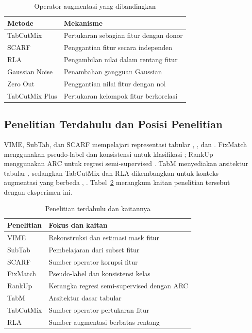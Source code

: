 \begin{table}[!htbp]
\caption{Operator augmentasi yang dibandingkan}
\label{tab:iii}
\centering
\footnotesize
\setlength{\tabcolsep}{3pt}
\renewcommand{\arraystretch}{1.1}
\begin{tabularx}{\columnwidth}{p{}X}
\hline
\textbf{Metode} & \textbf{Mekanisme} \\
\hline
TabCutMix & Pertukaran sebagian fitur dengan donor \cite{ref12} \\
SCARF & Penggantian fitur secara independen \cite{ref7} \\
RLA & Pengambilan nilai dalam rentang fitur \cite{ref13} \\
Gaussian Noise & Penambahan gangguan Gaussian \\
Zero Out & Penggantian nilai fitur dengan nol \\
TabCutMix Plus & Pertukaran kelompok fitur berkorelasi \cite{ref12} \\
\hline
\end{tabularx}
\end{table}

\subsection{Penelitian Terdahulu dan Posisi Penelitian}

VIME, SubTab, dan SCARF mempelajari representasi tabular \cite{ref5}, \cite{ref6}, dan \cite{ref7}. FixMatch menggunakan pseudo-label dan konsistensi untuk klasifikasi \cite{ref9}; RankUp menggunakan ARC untuk regresi semi-supervised \cite{ref10}. TabM menyediakan arsitektur tabular \cite{ref11}, sedangkan TabCutMix dan RLA dikembangkan untuk konteks augmentasi yang berbeda \cite{ref12}, \cite{ref13}. Tabel~\ref{tab:iv} merangkum kaitan penelitian tersebut dengan eksperimen ini.

\begin{table}[!htbp]
\caption{Penelitian terdahulu dan kaitannya}
\label{tab:iv}
\centering
\footnotesize
\setlength{\tabcolsep}{3pt}
\renewcommand{\arraystretch}{1.05}
\begin{tabularx}{\columnwidth}{p{}X}
\hline
\textbf{Penelitian} & \textbf{Fokus dan kaitan} \\
\hline
VIME \cite{ref5} & Rekonstruksi dan estimasi mask fitur \\
SubTab \cite{ref6} & Pembelajaran dari subset fitur \\
SCARF \cite{ref7} & Sumber operator korupsi fitur \\
FixMatch \cite{ref9} & Pseudo-label dan konsistensi kelas \\
RankUp \cite{ref10} & Kerangka regresi semi-supervised dengan ARC \\
TabM \cite{ref11} & Arsitektur dasar tabular \\
TabCutMix \cite{ref12} & Sumber operator pertukaran fitur \\
RLA \cite{ref13} & Sumber augmentasi berbatas rentang \\
\hline
\end{tabularx}
\end{table}

